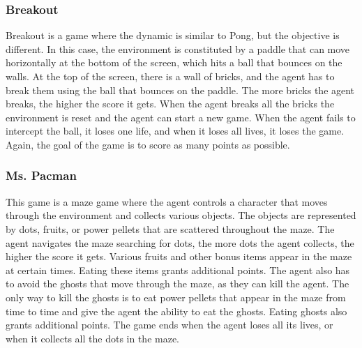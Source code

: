 \subsubsection{Breakout}
Breakout is a game where the dynamic is similar to Pong, but the objective is different.
In this case, the environment is constituted by a paddle that can move horizontally at the bottom of the screen, which hits a ball that bounces on the walls.
At the top of the screen, there is a wall of bricks, and the agent has to break them using the ball that bounces on the paddle.
The more bricks the agent breaks, the higher the score it gets.
When the agent breaks all the bricks the environment is reset and the agent can start a new game.
When the agent fails to intercept the ball, it loses one life, and when it loses all lives, it loses the game.
Again, the goal of the game is to score as many points as possible.


\subsubsection{Ms. Pacman}
This game is a maze game where the agent controls a character that moves through the environment and collects various objects.
The objects are represented by dots, fruits, or power pellets that are scattered throughout the maze.
The agent navigates the maze searching for dots, the more dots the agent collects, the higher the score it gets.
Various fruits and other bonus items appear in the maze at certain times.
Eating these items grants additional points.
The agent also has to avoid the ghosts that move through the maze, as they can kill the agent.
The only way to kill the ghosts is to eat power pellets that appear in the maze from time to time and give the agent the ability to eat the ghosts.
Eating ghosts also grants additional points.
The game ends when the agent loses all its lives, or when it collects all the dots in the maze. \\



